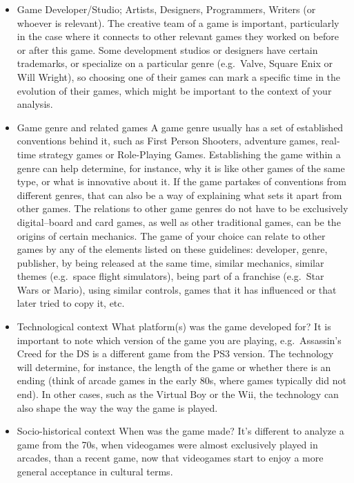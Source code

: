 \documentclass[
]{book}
\begin{document}
\begin{itemize}
\item
  Game Developer/Studio; Artists, Designers, Programmers, Writers (or whoever
  is relevant).
  The creative team of a game is important, particularly in the case where it
  connects to other relevant games they worked on before or after this game. Some
  development studios or designers have certain trademarks, or specialize on a
  particular genre (e.g.~Valve, Square Enix or Will Wright), so choosing one of their
  games can mark a specific time in the evolution of their games, which might be
  important to the context of your analysis.
\item
  Game genre and related games
  A game genre usually has a set of established conventions behind it, such as First
  Person Shooters, adventure games, real-time strategy games or Role-Playing
  Games. Establishing the game within a genre can help determine, for instance,
  why it is like other games of the same type, or what is innovative about it. If the
  game partakes of conventions from different genres, that can also be a way of
  explaining what sets it apart from other games. The relations to other game
  genres do not have to be exclusively digital--board and card games, as well as
  other traditional games, can be the origins of certain mechanics.
  The game of your choice can relate to other games by any of the elements listed
  on these guidelines: developer, genre, publisher, by being released at the same
  time, similar mechanics, similar themes (e.g.~space flight simulators), being part
  of a franchise (e.g.~Star Wars or Mario), using similar controls, games that it has
  influenced or that later tried to copy it, etc.
\item
  Technological context
  What platform(s) was the game developed for? It is important to note which
  version of the game you are playing, e.g.~Assassin's Creed for the DS is a different
  game from the PS3 version. The technology will determine, for instance, the
  length of the game or whether there is an ending (think of arcade games in the
  early 80s, where games typically did not end). In other cases, such as the Virtual
  Boy or the Wii, the technology can also shape the way the way the game is played.
\item
  Socio-historical context
  When was the game made? It's different to analyze a game from the 70s, when
  videogames were almost exclusively played in arcades, than a recent game, now
  that videogames start to enjoy a more general acceptance in cultural terms.

\end{itemize}
\end{document}
